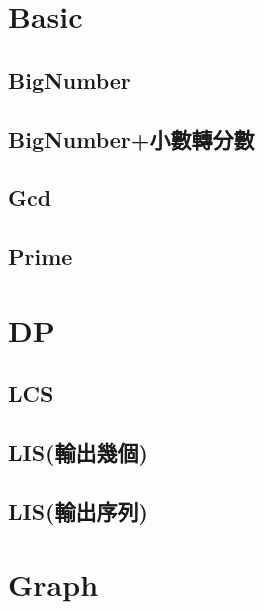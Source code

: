     


\section{Basic}

\subsection{BigNumber}


\subsection{BigNumber+小數轉分數}


\subsection{Gcd}


\subsection{Prime}


\section{DP}

\subsection{LCS}


\subsection{LIS(輸出幾個)}


\subsection{LIS(輸出序列)}

\section{Graph}

